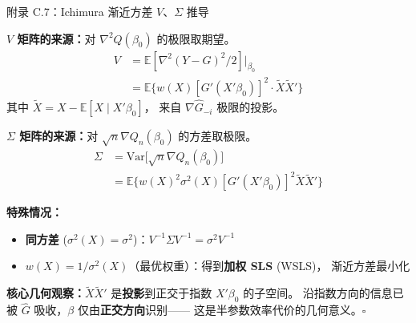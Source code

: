 \documentclass[aspectratio=169, 10pt]{beamer}
\begin{document}
\begin{frame}{附录 C.7：Ichimura 渐近方差 $V$、$\Sigma$ 推导}
  \hypertarget{proof-c7}{}

  \textbf{$V$ 矩阵的来源：}对 $\nabla^2 Q(\beta_0)$ 的极限取期望。
  \begin{align*}
  V &= \mathbb{E}[\nabla^2 (Y - G)^2 / 2] \big|_{\beta_0} \\
    &= \mathbb{E}\bigl\{w(X) [G'(X'\beta_0)]^2 \cdot \tilde X \tilde X'\bigr\}
  \end{align*}
  其中 $\tilde X = X - \mathbb{E}[X \mid X'\beta_0]$，
  来自 $\nabla \hat G_{-i}$ 极限的投影。

  \textbf{$\Sigma$ 矩阵的来源：}对 $\sqrt{n} \nabla Q_n(\beta_0)$ 的方差取极限。
  \begin{align*}
  \Sigma &= \text{Var}\bigl[\sqrt{n} \nabla Q_n(\beta_0)\bigr] \\
         &= \mathbb{E}\bigl\{w(X)^2 \sigma^2(X) [G'(X'\beta_0)]^2 \tilde X \tilde X'\bigr\}
  \end{align*}

  \textbf{特殊情况：}
  \begin{itemize}\setlength{\itemsep}{1pt}
    \item \textbf{同方差} ($\sigma^2(X) = \sigma^2$)：$V^{-1}\Sigma V^{-1} = \sigma^2 V^{-1}$
    \item \textbf{$w(X) = 1/\sigma^2(X)$}（最优权重）：得到\textbf{加权 SLS} (WSLS)，
    渐近方差最小化
  \end{itemize}

  \begin{keybox}
    \textbf{核心几何观察：}$\tilde X \tilde X'$ 是\textbf{投影}到正交于指数 $X'\beta_0$ 的子空间。
    沿指数方向的信息已被 $\hat G$ 吸收，$\beta$ 仅由\textbf{正交方向}识别——
    这是半参数效率代价的几何意义。$\square$
  \end{keybox}
  \hfill{\scriptsize\hyperlink{main-c7}{}}

\end{frame}
\end{document}
